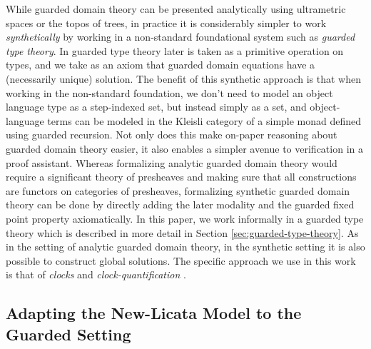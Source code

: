 While guarded domain theory can be presented analytically using
ultrametric spaces or the topos of trees, in practice it is
considerably simpler to work \emph{synthetically} by working in a
non-standard foundational system such as \emph{guarded type
theory}. In guarded type theory later is taken as a primitive
operation on types, and we take as an axiom that guarded domain
equations have a (necessarily unique) solution. The benefit of this
synthetic approach is that when working in the non-standard
foundation, we don't need to model an object language type as a
step-indexed set, but instead simply as a set, and object-language
terms can be modeled in the Kleisli category of a simple monad defined
using guarded recursion. Not only does this make on-paper reasoning
about guarded domain theory easier, it also enables a simpler avenue
to verification in a proof assistant. Whereas formalizing analytic
guarded domain theory would require a significant theory of presheaves
and making sure that all constructions are functors on categories of
presheaves, formalizing synthetic guarded domain theory can be done by
directly adding the later modality and the guarded fixed point
property axiomatically.
%
%
In this paper, we work informally in a guarded type theory which is described in
more detail in Section \ref{sec:guarded-type-theory}.
%
As in the setting of analytic guarded domain theory, in the synthetic setting it
is also possible to construct global solutions. The specific approach we use in
this work is that of \emph{clocks} and \emph{clock-quantification}
\cite{atkey-mcbride2013}.



\subsection{Adapting the New-Licata Model to the Guarded Setting}


